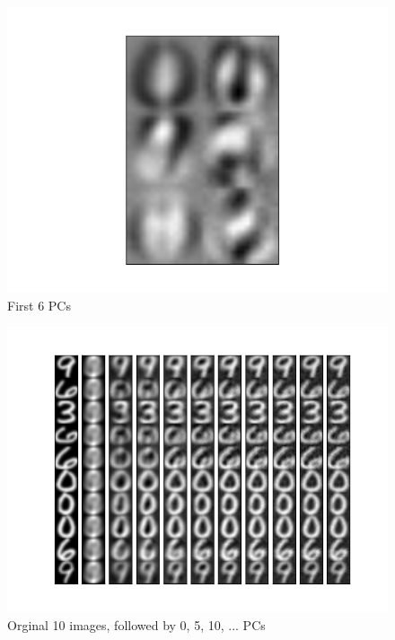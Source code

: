 \documentclass[a4paper,11pt]{article}
\begin{document}
\begin{figure}[H]
  \includegraphics[width=\linewidth]{5_b_c_05.png}
  \caption{First 6 PCs}\label{fig:awesome_image3}
\endminipage
\end{figure}

\begin{figure}[H]
  \includegraphics[width=\linewidth]{5_c_Xprime_05_45_allinone.png}
  \caption{Orginal 10 images, followed by 0, 5, 10, ... PCs}\label{fig:6}
\end{figure}
\end{document}
